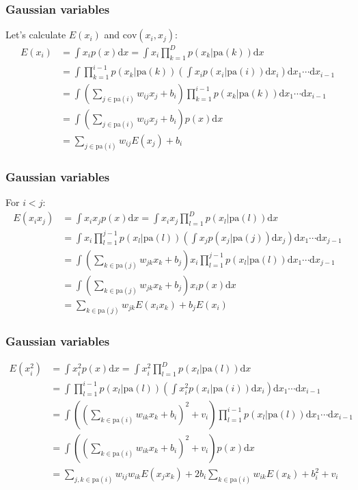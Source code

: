 \documentclass{beamer}
\begin{document}
\begin{frame}
    \frametitle{Gaussian variables}
    Let's calculate $E(x_{i})$ and $\mathrm{cov}(x_{i},x_{j})$:
    \begin{align*}
        E(x_{i})&=\int{}x_{i}p(x)\mathrm{d}x=\int{}x_{i}\prod_{k=1}^{D}p(x_{k}|\mathrm{pa}(k))\mathrm{d}x \\
        &=\int\prod_{k=1}^{i-1}p(x_{k}|\mathrm{pa}(k))(\int{}x_{i}p(x_{i}|\mathrm{pa}(i))\mathrm{d}x_{i})\mathrm{d}x_{1}\cdots\mathrm{d}x_{i-1} \\
        &=\int(\sum_{j\in\mathrm{pa}(i)}w_{ij}x_{j}+b_{i})\prod_{k=1}^{i-1}p(x_{k}|\mathrm{pa}(k))\mathrm{d}x_{1}\cdots\mathrm{d}x_{i-1} \\
        &=\int(\sum_{j\in\mathrm{pa}(i)}w_{ij}x_{j}+b_{i})p(x)\mathrm{d}x \\
        &=\sum_{j\in\mathrm{pa}(i)}w_{ij}E(x_{j})+b_{i}
    \end{align*}
\end{frame}

\begin{frame}
    \frametitle{Gaussian variables}
    For $i<j$:
    \begin{align*}
        E(x_{i}x_{j})&=\int{}x_{i}x_{j}p(x)\mathrm{d}x=\int{}x_{i}x_{j}\prod_{l=1}^{D}p(x_{l}|\mathrm{pa}(l))\mathrm{d}x \\
        &=\int{}x_{i}\prod_{l=1}^{j-1}p(x_{l}|\mathrm{pa}(l))(\int{}x_{j}p(x_{j}|\mathrm{pa}(j))\mathrm{d}x_{j})\mathrm{d}x_{1}\cdots\mathrm{d}x_{j-1} \\
        &=\int(\sum_{k\in\mathrm{pa}(j)}w_{jk}x_{k}+b_{j})x_{i}\prod_{l=1}^{j-1}p(x_{l}|\mathrm{pa}(l))\mathrm{d}x_{1}\cdots\mathrm{d}x_{j-1} \\
        &=\int(\sum_{k\in\mathrm{pa}(j)}w_{jk}x_{k}+b_{j})x_{i}p(x)\mathrm{d}x \\
        &=\sum_{k\in\mathrm{pa}(j)}w_{jk}E(x_{i}x_{k})+b_{j}E(x_{i})
    \end{align*}
\end{frame}

\begin{frame}
    \frametitle{Gaussian variables}
    \begin{align*}
        E(x_{i}^{2})&=\int{}x_{i}^{2}p(x)\mathrm{d}x=\int{}x_{i}^{2}\prod_{l=1}^{D}p(x_{l}|\mathrm{pa}(l))\mathrm{d}x \\
        &=\int\prod_{l=1}^{i-1}p(x_{l}|\mathrm{pa}(l))(\int{}x_{i}^{2}p(x_{i}|\mathrm{pa}(i))\mathrm{d}x_{i})\mathrm{d}x_{1}\cdots\mathrm{d}x_{i-1} \\
        &=\int((\sum_{k\in\mathrm{pa}(i)}w_{ik}x_{k}+b_{i})^{2}+v_{i})\prod_{l=1}^{i-1}p(x_{l}|\mathrm{pa}(l))\mathrm{d}x_{1}\cdots\mathrm{d}x_{i-1} \\
        &=\int((\sum_{k\in\mathrm{pa}(i)}w_{ik}x_{k}+b_{i})^{2}+v_{i})p(x)\mathrm{d}x \\
        &=\sum_{j,k\in\mathrm{pa}(i)}w_{ij}w_{ik}E(x_{j}x_k)+2b_{i}\sum_{k\in\mathrm{pa}(i)}w_{ik}E(x_{k})+b_{i}^{2}+v_{i}
    \end{align*}
\end{frame}
\end{document}
